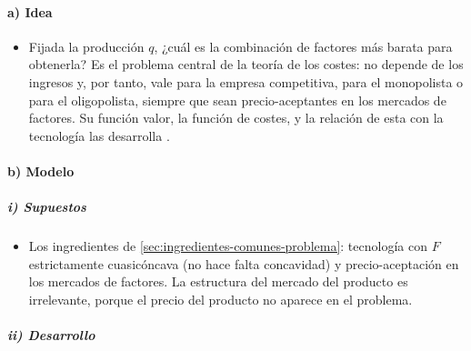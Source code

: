 \documentclass[11pt]{article}
\begin{document}
\paragraph{a) Idea}

\begin{itemize}
\item Fijada la producción $q$, ¿cuál es la combinación de factores más barata para obtenerla? Es el problema central de la teoría de los costes: no depende de los ingresos y, por tanto, vale para la empresa competitiva, para el monopolista o para el oligopolista, siempre que sean precio-aceptantes en los mercados de factores. Su función valor, la función de costes, y la relación de esta con la tecnología las desarrolla \textcite{Shephard1953Cost}.
\end{itemize}

\paragraph{b) Modelo}

\subparagraph{i) Supuestos}

\begin{itemize}
\item Los ingredientes de \ref{sec:ingredientes-comunes-problema}: tecnología con $F$ estrictamente cuasicóncava (no hace falta concavidad) y precio-aceptación en los mercados de factores. La estructura del mercado del producto es irrelevante, porque el precio del producto no aparece en el problema.
\end{itemize}

\subparagraph{ii) Desarrollo}
\end{document}
